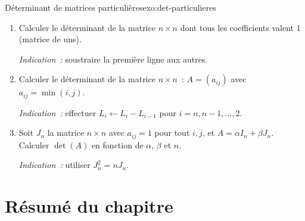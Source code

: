 \begin{exercise}{\challenging{} Déterminant de matrices particulières}{exo:det-particulieres}
  \begin{enumerate}[label=(\alph*)]
    \item Calculer le déterminant de la matrice $n\times n$ dont tous les
      coefficients valent $1$ (matrice de uns).

      \emph{Indication~:} soustraire la première ligne aux autres.
    \item Calculer le déterminant de la matrice $n\times n$~:
      $A=(a_{ij})$ avec $a_{ij}=\min(i,j)$.

      \emph{Indication~:} effectuer $L_i\leftarrow L_i-L_{i-1}$ pour
      $i=n,n-1,\ldots,2$.
    \item Soit $J_n$ la matrice $n\times n$ avec $a_{ij}=1$ pour tout
      $i,j$, et $A=\alpha I_n+\beta J_n$. Calculer $\det(A)$ en
      fonction de $\alpha$, $\beta$ et $n$.

      \emph{Indication~:} utiliser $J_n^2=nJ_n$.
  \end{enumerate}
\end{exercise}

\section*{Résumé du chapitre}

